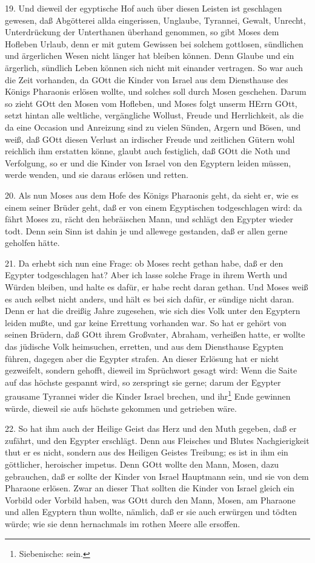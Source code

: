 19. Und dieweil der egyptische Hof auch über diesen Leisten ist geschlagen gewesen, daß Abgötterei allda eingerissen, Unglaube, Tyrannei, Gewalt, Unrecht, Unterdrückung der Unterthanen überhand genommen, so gibt Moses dem Hofleben Urlaub, denn er mit gutem Gewissen bei solchem gottlosen, sündlichen und ärgerlichen Wesen nicht länger hat bleiben können. Denn Glaube und ein ärgerlich, sündlich Leben können sich nicht mit einander vertragen. So war auch die Zeit vorhanden, da GOtt die Kinder von Israel aus dem Diensthause des Königs Pharaonis erlösen wollte, und solches soll durch Mosen geschehen. Darum so zieht GOtt den Mosen vom Hofleben, und Moses folgt unserm HErrn GOtt, setzt hintan alle weltliche, vergängliche Wollust, Freude und Herrlichkeit, als die da eine Occasion und Anreizung sind zu vielen Sünden, Argern und Bösen, und weiß, daß GOtt diesen Verlust an irdischer Freude und zeitlichen Gütern wohl reichlich ihm erstatten könne, glaubt auch festiglich, daß GOtt die Noth und Verfolgung, so er und die Kinder von Israel von den Egyptern leiden müssen, werde wenden, und sie daraus erlösen und retten.

20. Als nun Moses aus dem Hofe des Königs Pharaonis geht, da sieht er, wie es einem seiner Brüder geht, daß er von einem Egyptischen todgeschlagen wird: da fährt Moses zu, rächt den hebräischen Mann, und schlägt den Egypter wieder todt. Denn sein Sinn ist dahin je und allewege gestanden, daß er allen gerne geholfen hätte.

21. Da erhebt sich nun eine Frage: ob Moses recht gethan habe, daß er den Egypter todgeschlagen hat? Aber ich lasse solche Frage in ihrem Werth und Würden bleiben, und halte es dafür, er habe recht daran gethan. Und Moses weiß es auch selbst nicht anders, und hält es bei sich dafür, er sündige nicht daran. Denn er hat die dreißig Jahre zugesehen, wie sich dies Volk unter den Egyptern leiden mußte, und gar keine Errettung vorhanden war. So hat er gehört von seinen Brüdern, daß GOtt ihrem Großvater, Abraham, verheißen hatte, er wollte das jüdische Volk heimsuchen, erretten, und aus dem Diensthause Egypten führen, dagegen aber die Egypter strafen. An dieser Erlösung hat er nicht gezweifelt, sondern gehofft, dieweil im Sprüchwort gesagt wird: Wenn die Saite auf das höchste gespannt wird, so zerspringt sie gerne; darum der Egypter grausame Tyrannei wider die Kinder Israel brechen, und ihr\footnote{Siebenische: sein.} Ende gewinnen würde, dieweil sie aufs höchste gekommen und getrieben wäre.

22. So hat ihm auch der Heilige Geist das Herz und den Muth gegeben, daß er zufährt, und den Egypter erschlägt. Denn aus Fleisches und Blutes Nachgierigkeit thut er es nicht, sondern aus des Heiligen Geistes Treibung; es ist in ihm ein göttlicher, heroischer impetus. Denn GOtt wollte den Mann, Mosen, dazu gebrauchen, daß er sollte der Kinder von Israel Hauptmann sein, und sie von dem Pharaone erlösen. Zwar an dieser That sollten die Kinder von Israel gleich ein Vorbild oder Vorbild haben, was GOtt durch den Mann, Mosen, am Pharaone und allen Egyptern thun wollte, nämlich, daß er sie auch erwürgen und tödten würde; wie sie denn hernachmals im rothen Meere alle ersoffen.

